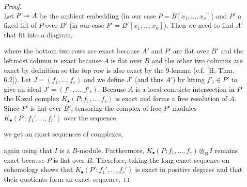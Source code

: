 \documentclass[12pt]{article}
\begin{document}
\begin{proof}
\bigskip\\
Let $P \twoheadrightarrow A$ be the ambient embedding (in our case $P = B[x_1, \dots, x_n]$) and $P'$ a fixed lift of $P$ over $B'$ (in our case $P' = B'[x_1, \dots, x_n]$). Then we need to find $A'$ that fit into a diagram,
\begin{center}
\end{center}
where the bottom two rows are exact because $A'$ and $P'$ are flat over $B'$ and the leftmost column is exact because $A$ is flat over $B$ and the other two columns are exact by definition so the top row is also exact by the 9-lemma (c.f. [H, Thm. 6.2]). Let $J = (f_1, \dots, f_r)$ and we define $J'$ (and thus $A'$) by lifting $f'_i \in P'$ to give an ideal $J' = (f'_1, \dots, f'_r)$. Because $A$ is a local complete intersection in $P$ the Kozul complex $K_\bullet(P; f_1, \dots, f_r)$ is exact and forms a free resolution of $A$. Since $P'$ is flat over $B'$, tensoring the complex of free $P'$-modules $K_\bullet(P'; f_1', \dots, f_r')$ over the sequence,
\begin{center}
\end{center}
we get an exact sequences of complexes,
\begin{center}
\end{center}
again using that $I$ is a $B$-module. Furthermore, $K_\bullet(P; f_1, \dots, f_r) \otimes_{B} I$ remains exact because $P$ is flat over $B$. Therefore, taking the long exact sequence on cohomology shows that $K_\bullet(P'; f_1', \dots, f_r')$ is exact in positive degrees and that their quotients form an exact sequence,

\end{proof}
\end{document}
